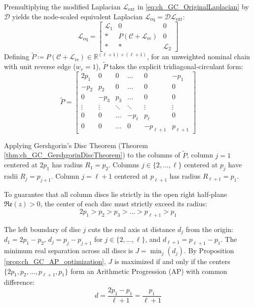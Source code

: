 Premultiplying the modified Laplacian $\mathcal{L}_{\text{ext}}$ in \eqref{eq:ch_GC_OriginalLaplacian} by $\mathcal{D}$ yields the node-scaled equivalent Laplacian $\mathcal{L}_{\text{eq}} = \mathcal{D} \mathcal{L}_{\text{ext}}$:
\begin{equation} \label{eq:ch_GC_LaplacianEqNode}
	\mathcal{L}_{\text{eq}} = \begin{bmatrix}
		\mathcal{L}_1 & 0 & 0 \\
		* & P(\mathcal{C} + \mathcal{L}_{\text{re}}) & 0 \\
		* & * & \mathcal{L}_2
	\end{bmatrix}
\end{equation}
Defining $\tilde{P} \coloneqq P(\mathcal{C} + \mathcal{L}_{\text{re}}) \in \mathbb{R}^{(\ell+1) \times (\ell+1)}$, for an unweighted nominal chain with unit reverse edge ($w_r = 1$), $\tilde{P}$ takes the explicit tridiagonal-circulant form:
\begin{equation}\label{eq:ch_GC_NSChainLoop}
	\tilde{P} = \begin{bmatrix}
		2p_1  & 0 & 0 & \dots & 0 & -p_1 \\
		-p_2 & p_2 & 0 & \dots & 0 & 0 \\
		0 & -p_3 & p_3 & \dots & 0 & 0 \\
		\vdots & \vdots & \ddots & \ddots & \vdots & \vdots \\
		0 & 0 & \dots & -p_{\ell} & p_{\ell} & 0 \\
		0 & 0 & \dots & 0 & -p_{\ell+1} & p_{\ell+1}
	\end{bmatrix}
\end{equation}

Applying Gershgorin's Disc Theorem (Theorem \ref{thm:ch_GC_GershgorinDiscTheorem}) to the columns of $\tilde{P}$, column $j=1$ centered at $2p_1$ has radius $R_1 = p_2$. Columns $j \in \{2, \dots, \ell\}$ centered at $p_j$ have radii $R_j = p_{j+1}$. Column $j=\ell+1$ centered at $p_{\ell+1}$ has radius $R_{\ell+1} = p_1$. 

To guarantee that all column discs lie strictly in the open right half-plane $\mathfrak{Re}(z) > 0$, the center of each disc must strictly exceed its radius:
\begin{equation}\label{eq:ch_GC_NSInequality}
	2p_1 > p_2 > p_3 > \dots > p_{\ell+1} > p_1
\end{equation}

The left boundary of disc $j$ cuts the real axis at distance $d_j$ from the origin: $d_1 = 2p_1 - p_2$, $d_j = p_j - p_{j+1}$ for $j \in \{2, \dots, \ell\}$, and $d_{\ell+1} = p_{\ell+1} - p_1$. The minimum real separation across all discs is $J = \min_j (d_j)$. By Proposition \ref{prop:ch_GC_AP_optimization}, $J$ is maximized if and only if the centers $\{2p_1, p_2, \dots, p_{\ell+1}, p_1\}$ form an Arithmetic Progression (AP) with common difference:
\begin{equation}\label{eq:ch_GC_node_diff}
	d = \frac{2p_1 - p_1}{\ell + 1} = \frac{p_1}{\ell + 1}
\end{equation}

